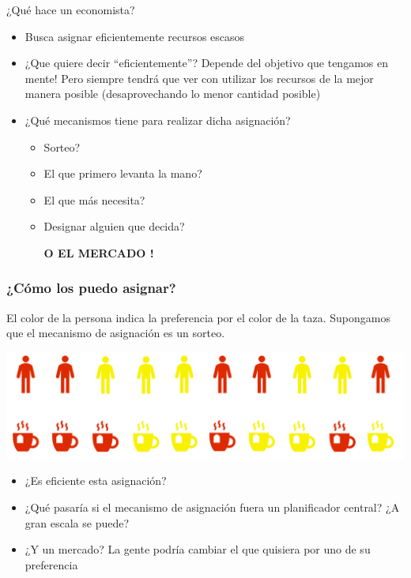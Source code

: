 \documentclass{beamer}
\begin{document}
\begin{frame}{¿Qué hace un economista?}
    \begin{itemize}
        \item Busca asignar eficientemente recursos escasos \vspace{3mm} \\
        \item ¿Que quiere decir ``eficientemente''? Depende del objetivo que tengamos en mente! Pero siempre tendrá que ver con utilizar los recursos de la mejor manera posible (desaprovechando lo menor cantidad posible) \vspace{3mm} \\
        \item ¿Qué mecanismos tiene para realizar dicha asignación? 
        \begin{itemize}
            \item Sorteo?
            \item El que primero levanta la mano?
            \item El que más necesita?
            \item Designar alguien que decida?
            \begin{boxA}
                \begin{center}
                    \textbf{O EL MERCADO !}
                \end{center}
            \end{boxA}
        \end{itemize}
    \end{itemize}
\end{frame}

\begin{frame}
\frametitle{¿Cómo los puedo asignar?}
El color de la persona indica la preferencia por el color de la taza. Supongamos que el mecanismo de asignación es un sorteo.
\begin{center}
    \includegraphics[scale=0.8]{../Figures/Tazon.png}
\end{center}
\begin{itemize}
    \item ¿Es eficiente esta asignación?
    \item ¿Qué pasaría si el mecanismo de asignación fuera un planificador central? ¿A gran escala se puede?
    \item ¿Y un mercado? La gente podría cambiar el que quisiera por uno de su preferencia
\end{itemize}
\end{frame}
\end{document}
